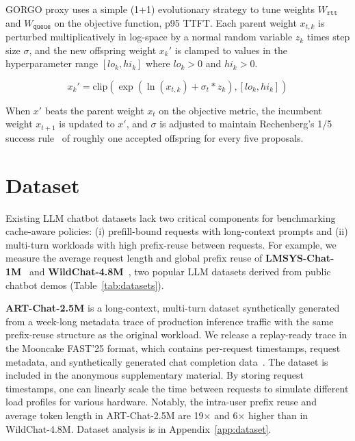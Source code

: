 \documentclass{article}
\begin{document}
GORGO proxy uses a simple (1+1) evolutionary strategy to tune weights $W_{\texttt{rtt}}$ and $W_{\texttt{queue}}$ on the objective function, p95 TTFT.
Each parent weight $x_{t,k}$ is perturbed multiplicatively in log-space by a normal random variable $z_k$ times step size $\sigma$, and the new offspring weight $x_k'$ is clamped to values in the hyperparameter range $[lo_k, hi_k]$ where $lo_k > 0$ and $hi_k > 0$.

\begin{equation}
x_k' = \mathrm{clip}\left(\exp(\ln(x_{t,k}) + \sigma_t * z_k), [lo_k, hi_k]\right)
\end{equation}

When $x'$ beats the parent weight $x_t$ on the objective metric, the incumbent weight $x_{t+1}$ is updated to $x'$, and $\sigma$ is adjusted to maintain Rechenberg's 1/5 success rule~\citep{rechenberg1973} of roughly one accepted offspring for every five proposals.

\section{Dataset}
\label{sec:characterization}

Existing LLM chatbot datasets lack two critical components for benchmarking
cache-aware policies: (i) prefill-bound requests with long-context prompts and
(ii) multi-turn workloads with high prefix-reuse between requests. For example,
we measure the average request length and global prefix reuse of
\textbf{LMSYS-Chat-1M}~\citep{lmsys2024} and \textbf{WildChat-4.8M}~\citep{wildchat2024},
two popular LLM datasets derived from public chatbot demos
(Table~\ref{tab:datasets}).

\textbf{ART-Chat-2.5M} is a long-context, multi-turn dataset synthetically generated from
a week-long metadata trace of production inference traffic with the same
prefix-reuse structure as the original workload. We release a replay-ready trace
in the Mooncake FAST'25 format, which contains per-request timestamps, request
metadata, and synthetically generated chat completion data~\citep{qin2024mooncake}.
The dataset is included in the anonymous supplementary material.
By storing request timestamps, one can linearly scale the time between requests
to simulate different load profiles for various hardware. Notably, the intra-user prefix reuse and average token length in ART-Chat-2.5M
are 19$\times$ and 6$\times$ higher than in WildChat-4.8M. Dataset analysis is in Appendix~\ref{app:dataset}.
\end{document}
